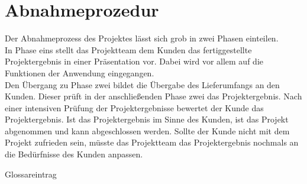 \chapter{Abnahmeprozedur}
Der Abnahmeprozess des Projektes lässt sich grob in zwei Phasen einteilen.\\
In Phase eins stellt das Projektteam dem Kunden das fertiggestellte Projektergebnis in einer Präsentation vor. Dabei wird vor allem auf die Funktionen der Anwendung eingegangen.\\
Den Übergang zu Phase zwei bildet die Übergabe des Lieferumfangs an den Kunden. Dieser prüft in der anschließenden Phase zwei das Projektergebnis. Nach einer intensiven Prüfung der Projektergebnisse bewertet der Kunde das Projektergebnis. Ist das Projektergebnis im Sinne des Kunden, ist das Projekt abgenommen und kann abgeschlossen werden. Sollte der Kunde nicht mit dem Projekt zufrieden sein, müsste das Projektteam das Projektergebnis nochmals an die Bedürfnisse des Kunden anpassen.  

\gls{Glossareintrag}